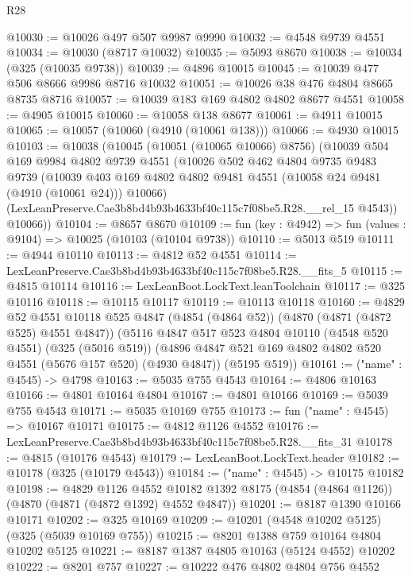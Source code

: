 \begin{lexlean}{R28}
\begin{coremodule}
@10030 := @10026 @497 @507 @9987 @9990
@10032 := @4548 @9739 @4551
@10034 := @10030 (@8717 @10032)
@10035 := @5093 @8670
@10038 := @10034 (@325 (@10035 @9738))
@10039 := @4896 @10015
@10045 := @10039 @477 @506 @8666 @9986 @8716 @10032
@10051 := @10026 @38 @476 @4804 @8665 @8735 @8716
@10057 := @10039 @183 @169 @4802 @4802 @8677 @4551
@10058 := @4905 @10015
@10060 := @10058 @138 @8677
@10061 := @4911 @10015
@10065 := @10057 (@10060 (@4910 (@10061 @138)))
@10066 := @4930 @10015
@10103 := @10038
    (@10045
      (@10051 (@10065 @10066) @8756)
      (@10039
        @504
        @169
        @9984
        @4802
        @9739
        @4551
        (@10026
          @502
          @462
          @4804
          @9735
          @9483
          @9739
          (@10039 @403 @169 @4802 @4802 @9481 @4551 (@10058 @24 @9481 (@4910 (@10061 @24))) @10066)
          (LexLeanPreserve.Cae3b8bd4b93b4633bf40c115c7f08be5.R28.__rel_15 @4543))
        @10066))
@10104 := @8657 @8670
@10109 := fun (key : @4942) => fun (values : @9104) => @10025 (@10103 (@10104 @9738))
@10110 := @5013 @519
@10111 := @4944 @10110
@10113 := @4812 @52 @4551
@10114 := LexLeanPreserve.Cae3b8bd4b93b4633bf40c115c7f08be5.R28.__fits_5
@10115 := @4815 @10114
@10116 := LexLeanBoot.LockText.leanToolchain
@10117 := @325 @10116
@10118 := @10115 @10117
@10119 := @10113 @10118
@10160 := @4829
    @52
    @4551
    @10118
    @525
    @4847
    (@4854 (@4864 @52))
    (@4870 (@4871 (@4872 @525) @4551 @4847))
    (@5116
      @4847
      @517
      @523
      @4804
      @10110
      (@4548 @520 @4551)
      (@325 (@5016 @519))
      (@4896 @4847 @521 @169 @4802 @4802 @520 @4551 (@5676 @157 @520) (@4930 @4847))
      (@5195 @519))
@10161 := ("name" : @4545) -> @4798
@10163 := @5035 @755 @4543
@10164 := @4806 @10163
@10166 := @4801 @10164 @4804
@10167 := @4801 @10166
@10169 := @5039 @755 @4543
@10171 := @5035 @10169 @755
@10173 := fun ("name" : @4545) => @10167 @10171
@10175 := @4812 @1126 @4552
@10176 := LexLeanPreserve.Cae3b8bd4b93b4633bf40c115c7f08be5.R28.__fits_31
@10178 := @4815 (@10176 @4543)
@10179 := LexLeanBoot.LockText.header
@10182 := @10178 (@325 (@10179 @4543))
@10184 := ("name" : @4545) -> @10175 @10182
@10198 := @4829
    @1126
    @4552
    @10182
    @1392
    @8175
    (@4854 (@4864 @1126))
    (@4870 (@4871 (@4872 @1392) @4552 @4847))
@10201 := @8187 @1390 @10166 @10171
@10202 := @325 @10169
@10209 := @10201 (@4548 @10202 @5125) (@325 (@5039 @10169 @755))
@10215 := @8201 @1388 @759 @10164 @4804 @10202 @5125
@10221 := @8187 @1387 @4805 @10163 (@5124 @4552) @10202
@10222 := @8201 @757
@10227 := @10222 @476 @4802 @4804 @756 @4552

\end{coremodule}
\end{lexlean}
